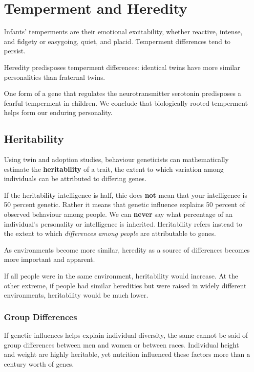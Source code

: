 \documentclass[12pt]{article}
\begin{document}
\section*{Temperment and Heredity}
Infants' temperments are their emotional excitability, whether reactive, intense, and fidgety or easygoing, quiet, and placid. Temperment differences tend to persist.

Heredity predisposes temperment differences: identical twins have more similar personalities than fraternal twins.

One form of a gene that regulates the neurotransmitter serotonin predisposes a fearful temperment in children. We conclude that biologically rooted temperment helps form our enduring personality.

\subsection*{Heritability}
Using twin and adoption studies, behaviour geneticists can mathematically estimate the \textbf{heritability} of a trait, the extent to which variation among individuals can be attributed to differing genes.

If the heritability intelligence is half, thie does \textbf{not} mean that your intelligence is 50 percent genetic. Rather it means that genetic influence explains 50 percent of observed behaviour among people. We can \textbf{never} say what percentage of an individual's personality or intelligence is inherited. Heritability refers instead to the extent to which \textit{differences among people} are attributable to genes.

As environments become more similar, heredity as a source of differences becomes more important and apparent.

If all people were in the same environment, heritability would increase. At the other extreme, if people had similar heredities but were raised in widely different environments, heritability would be much lower.

\subsubsection*{Group Differences}
If genetic influences helps explain individual diversity, the same cannot be said of group differences between men and women or between races. Individual height and weight are highly heritable, yet nutrition influenced these factors more than a century worth of genes.
\end{document}

